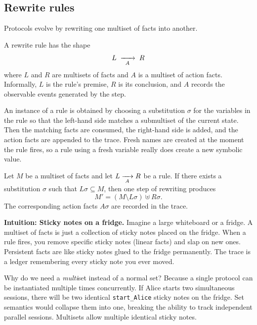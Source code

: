\subsection{Rewrite rules}

Protocols evolve by rewriting one multiset of facts into another.

\begin{definition}
\label{def:tamarin-rule}
A rewrite rule has the shape
\[
  L \; \xrightarrow[{\;\;A\;\;}]{} \; R
\]
where $L$ and $R$ are multisets of facts and $A$ is a multiset of action
facts.  Informally, $L$ is the rule's premise, $R$ is its conclusion, and $A$
records the observable events generated by the step.
\end{definition}

An instance of a rule is obtained by choosing a substitution $\sigma$ for the
variables in the rule so that the left-hand side matches a submultiset of the
current state.  Then the matching facts are consumed, the right-hand side is
added, and the action facts are appended to the trace.  Fresh names are
created at the moment the rule fires, so a rule using a fresh variable really
does create a new symbolic value.

\begin{definition}
\label{def:tamarin-step}
Let $M$ be a multiset of facts and let $L \xrightarrow[{\;A\;}]{} R$ be a rule.
If there exists a substitution $\sigma$ such that $L\sigma \subseteq M$,
then one step of rewriting produces
\[
  M' = (M \setminus L\sigma) \uplus R\sigma.
\]
The corresponding action facts $A\sigma$ are recorded in the trace.
\end{definition}

\medskip\noindent
\textbf{Intuition: Sticky notes on a fridge.}  Imagine a large whiteboard or a fridge. A multiset of facts is just a collection of sticky notes placed on the fridge. When a rule fires, you remove specific sticky notes (linear facts) and slap on new ones. Persistent facts are like sticky notes glued to the fridge permanently. The trace is a ledger remembering every sticky note you ever moved.

Why do we need a \emph{multi}set instead of a normal set? Because a single protocol can be instantiated multiple times concurrently. If Alice starts two simultaneous sessions, there will be two identical \texttt{start\_Alice} sticky notes on the fridge. Set semantics would collapse them into one, breaking the ability to track independent parallel sessions. Multisets allow multiple identical sticky notes.


